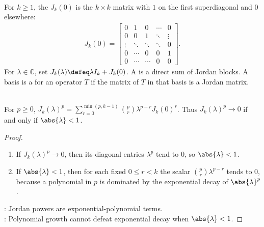 \begin{definition} \label{def:jordan-chain-block-and-matrix} \\
For $k\geq1$, the  $J_k(0)$ is the $k\times k$ matrix with $1$ on the first superdiagonal and $0$ elsewhere:
\begin{align}
J_k(0)=
\begin{bmatrix}
0&1&0&\cdots&0\\
0&0&1&\ddots&\vdots\\
\vdots&\ddots&\ddots&\ddots&0\\
0&\cdots&0&0&1\\
0&\cdots&\cdots&0&0
\end{bmatrix}.
\nonumber
\end{align}
For $\lambda\in\mathbb{C}$, set $J_k(\lambda)\defeq\lambda I_k+J_k(0)$. A  is a direct sum of Jordan blocks. A basis is a  for an operator $T$ if the matrix of $T$ in that basis is a Jordan matrix.
\end{definition}

\begin{proposition} \label{prop:powers-of-jordan-block} \\
For $p\geq0$, $J_k(\lambda)^p =\sum\limits_{r=0}^{\min(p,k-1)}\binom{p}{r}\lambda^{p-r}J_k(0)^r$. Thus $J_k(\lambda)^p\to0$ if and only if $\abs{\lambda}<1$.
\begin{proof}
\begin{enumerate}[label=\roman*.]
\setlength{\itemsep}{0pt}
\item[$(\Rightarrow)$] If $J_k(\lambda)^p\to0$, then its diagonal entries $\lambda^p$ tend to $0$, so $\abs{\lambda}<1$.
\item[$(\Leftarrow)$] If $\abs{\lambda}<1$, then for each fixed $0\leq r<k$ the scalar $\binom{p}{r}\lambda^{p-r}$ tends to $0$, because a polynomial in $p$ is dominated by the exponential decay of $\abs{\lambda}^{p}$.
\end{enumerate}
: Jordan powers are exponential-polynomial terms.\\
: Polynomial growth cannot defeat exponential decay when $\abs{\lambda}<1$.
\end{proof}
\end{proposition}

